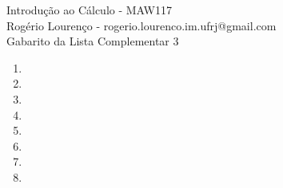 \documentclass{article}
\begin{document}
\begin{flushleft}
	Introdução ao Cálculo - MAW117\\
	Rogério Lourenço - rogerio.lourenco.im.ufrj@gmail.com\\
	Gabarito da Lista Complementar 3
\end{flushleft}

\begin{enumerate}
	\item
	\item
	\item
	\item
	\item
	\item
	\item
	\item
\end{enumerate}
\end{document}
